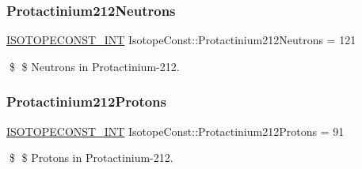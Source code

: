 \subsubsection{\texorpdfstring{Protactinium212\+Neutrons}{Protactinium212Neutrons}}
{\footnotesize\ttfamily \mbox{\hyperlink{group___isotope_const-_macros_ga5f18360b3e99483a35c32d789e62621c}{I\+S\+O\+T\+O\+P\+E\+C\+O\+N\+S\+T\+\_\+\+I\+NT}} Isotope\+Const\+::\+Protactinium212\+Neutrons = 121}

\$ \$ Neutrons in Protactinium-\/212. \mbox{\label{group___isotope_const-_protactinium-_pa212_ga0b88c59bc62d9ab09d5d554972699c88}} 
\subsubsection{\texorpdfstring{Protactinium212\+Protons}{Protactinium212Protons}}
{\footnotesize\ttfamily \mbox{\hyperlink{group___isotope_const-_macros_ga5f18360b3e99483a35c32d789e62621c}{I\+S\+O\+T\+O\+P\+E\+C\+O\+N\+S\+T\+\_\+\+I\+NT}} Isotope\+Const\+::\+Protactinium212\+Protons = 91}

\$ \$ Protons in Protactinium-\/212. 
